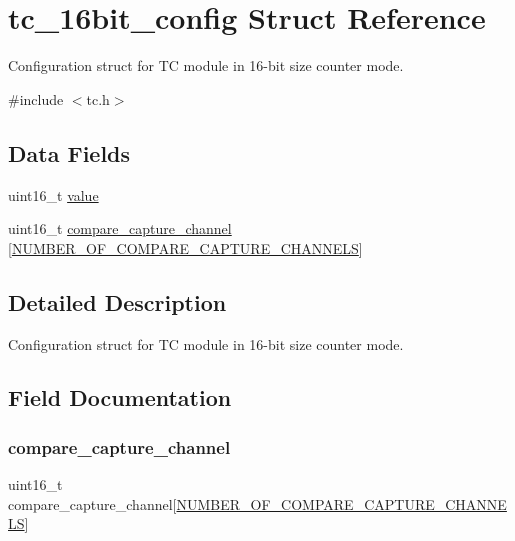 \hypertarget{structtc__16bit__config}{}\section{tc\+\_\+16bit\+\_\+config Struct Reference}
\label{structtc__16bit__config}


Configuration struct for TC module in 16-\/bit size counter mode.  




{\ttfamily \#include $<$tc.\+h$>$}

\subsection*{Data Fields}
\begin{DoxyCompactItemize}
\item 
uint16\+\_\+t \mbox{\hyperlink{structtc__16bit__config_a900b69af7d674b8db3bceae754b4955a}{value}}
\item 
uint16\+\_\+t \mbox{\hyperlink{structtc__16bit__config_af905685ae070a2592d0f2e99a1b4f879}{compare\+\_\+capture\+\_\+channel}} \mbox{[}\mbox{\hyperlink{group__asfdoc__sam0__tc__group_gac837f9db5df1793578c195a979c6a9d3}{N\+U\+M\+B\+E\+R\+\_\+\+O\+F\+\_\+\+C\+O\+M\+P\+A\+R\+E\+\_\+\+C\+A\+P\+T\+U\+R\+E\+\_\+\+C\+H\+A\+N\+N\+E\+LS}}\mbox{]}
\end{DoxyCompactItemize}


\subsection{Detailed Description}
Configuration struct for TC module in 16-\/bit size counter mode. 

\subsection{Field Documentation}
\mbox{\label{structtc__16bit__config_af905685ae070a2592d0f2e99a1b4f879}} 
\subsubsection{\texorpdfstring{compare\_capture\_channel}{compare\_capture\_channel}}
{\footnotesize\ttfamily uint16\+\_\+t compare\+\_\+capture\+\_\+channel\mbox{[}\mbox{\hyperlink{group__asfdoc__sam0__tc__group_gac837f9db5df1793578c195a979c6a9d3}{N\+U\+M\+B\+E\+R\+\_\+\+O\+F\+\_\+\+C\+O\+M\+P\+A\+R\+E\+\_\+\+C\+A\+P\+T\+U\+R\+E\+\_\+\+C\+H\+A\+N\+N\+E\+LS}}\mbox{]}}

